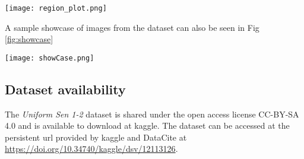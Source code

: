 \begin{figure*}
    \texttt{[image: region\_plot.png]}
    \caption{All regions from where data has been included in the dataset}
    \label{fig:map}
\end{figure*}

A sample showcase of images from the dataset can also be seen in Fig \ref{fig:showcase}

\begin{figure*}
    \texttt{[image: showCase.png]}
    \caption{Sample images from the dataset. Top row: Sentinel-1 images, bottom row: corresponding Sentinel-2 images}
    \label{fig:showcase}
\end{figure*}

\subsection{Dataset availability}
The \textit{Uniform Sen 1-2} dataset is shared under the open access license CC-BY-SA 4.0 and is available to download at kaggle. The dataset can be accessed at the persistent url provided by kaggle and DataCite at \url{https://doi.org/10.34740/kaggle/dsv/12113126}.